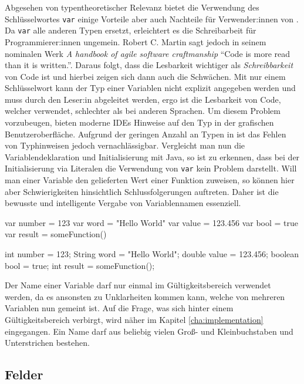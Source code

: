Abgesehen von typentheoretischer Relevanz bietet die Verwendung des Schlüsselwortes \texttt{var} einige Vorteile aber auch Nachteile für Verwender:innen von \toya. Da \texttt{var} alle anderen Typen ersetzt, erleichtert es die Schreibarbeit für Programmierer:innen ungemein. Robert C. Martin sagt jedoch in seinem nominalen Werk \textit{A handbook of agile software craftmanship} ``Code is more read than it is written.''. Daraus folgt, dass die Lesbarkeit wichtiger als \textit{Schreibbarkeit} von Code ist und hierbei zeigen sich dann auch die Schwächen. Mit nur einem Schlüsselwort kann der Typ einer Variablen nicht explizit angegeben werden und muss durch den Leser:in abgeleitet werden, ergo ist die Lesbarkeit von Code, welcher \toya verwendet, schlechter als bei anderen Sprachen. Um diesem Problem vorzubeugen, bieten moderne IDEs Hinweise auf den Typ in der grafischen Benutzeroberfläche. Aufgrund der geringen Anzahl an Typen in \toya ist das Fehlen von Typhinweisen jedoch vernachlässigbar. Vergleicht man nun die Variablendeklaration und Initialisierung mit Java, so ist zu erkennen, dass bei der Initialisierung via Literalen die Verwendung von \texttt{var} kein Problem darstellt. Will man einer Variable den gelieferten Wert einer Funktion zuweisen, so können hier aber Schwierigkeiten hinsichtlich Schlussfolgerungen auftreten. Daher ist die bewusste und intelligente Vergabe von Variablennamen essenziell.

\begin{ToyaCode}[numbers=none, caption={Variablendeklaration in toya}]
var number = 123
var word = "Hello World"
var value = 123.456
var bool = true
var result = someFunction()
\end{ToyaCode}

\begin{JavaCode}[numbers=none,caption={Variablendeklaration in Java (vor Version 10)}]
int number = 123;
String word = "Hello World";
double value = 123.456;
boolean bool = true;
int result = someFunction();
\end{JavaCode}

Der Name einer Variable darf nur einmal im Gültigkeitsbereich verwendet werden, da es ansonsten zu Unklarheiten kommen kann, welche von mehreren Variablen nun gemeint ist. Auf die Frage, was sich hinter einem Gültigkeitsbereich verbirgt, wird näher im Kapitel \ref{cha:implementation} eingegangen. Ein Name darf aus beliebig vielen Groß- und Kleinbuchstaben und Unterstrichen bestehen.

\subsection{Felder}

